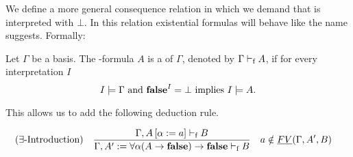 We define a more general consequence relation in which we demand that \false{} is interpreted with $\bot$. In this relation existential formulas will behave like the name suggests. Formally:
\begin{definition}\label{def.3.3}
Let $\Gamma$ be a basis. The \SysP-formula $A$ is a  of $\Gamma$, denoted by $\Gamma\vdash_\text{f} A$, if for every interpretation $I$
\[I\models\Gamma \text{ and } \textbf{false}^I=\bot\text{ implies }I\models A.\]

This allows us to add the following deduction rule.
\begin{mdframed}
	\begin{align*}
		  & (\exists\text{-Introduction}) &   & \frac 
		{\Gamma,A\left[\alpha:=a\right]\PModelsf B}
		{\Gamma,A':=\forall\alpha(A\to\false)\to\false\PModelsf B} && a\notin\emph{FV}(\Gamma,A',B) %
	\end{align*}
\end{mdframed}
\end{definition}
